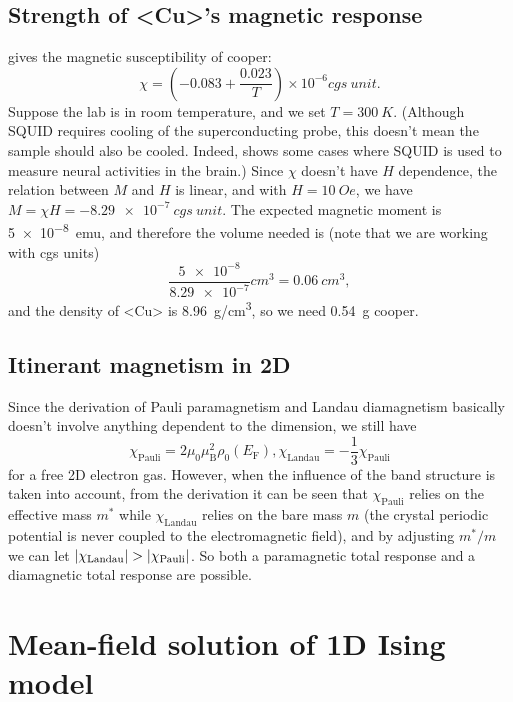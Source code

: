 \documentclass[hyperref, a4paper]{article}
\def\ce#1{<#1>}%
\newcommand*{\efermi}{E_{\text{F}}}
\newcommand*{\muB}{\mu_{\text{B}}}
\begin{document}
\subsection{Strength of \ce{Cu}'s magnetic response}

\cite{cooper_magnetic} gives the magnetic susceptibility of cooper:
\begin{equation}
    \chi=\left(-0.083+\frac{0.023}{T}\right) \times 10^{-6} \unit{cgs\ unit}.
\end{equation}
Suppose the lab is in room temperature, 
and we set $T = \SI{300}{K}$.
(Although SQUID requires cooling of the superconducting probe, 
this doesn't mean the sample should also be cooled. 
Indeed, \cite{singh2014magnetoencephalography} shows 
some cases where SQUID is used to measure 
neural activities in the brain.)
Since $\chi$ doesn't have $H$ dependence,
the relation between $M$ and $H$ is linear,
and with $H = \SI{10}{Oe}$,
we have $M = \chi H = \SI{-8.29e-7}{cgs\ unit}$.
The expected magnetic moment is \SI{5e-8}{emu}, 
and therefore the volume needed is (note that we are working with cgs units)
\[
    \frac{\num{5e-8}}{\num{8.29e-7}} \unit{cm^3} = \SI{0.06}{cm^3},
\]
and the density of \ce{Cu} is \SI{8.96}{g/cm^3},
so we need \SI{0.54}{g} cooper.

\subsection{Itinerant magnetism in 2D}

Since the derivation of Pauli paramagnetism 
and Landau diamagnetism basically 
doesn't involve anything dependent to the dimension,
we still have 
\begin{equation}
    \chi_{\text{Pauli}} = 2 \mu_0 \muB^2 \rho_0(\efermi),
    \chi_{\text{Landau}} = - \frac{1}{3} \chi_{\text{Pauli}}
\end{equation}
for a free 2D electron gas. 
However, when the influence of the band structure is taken into account, 
from the derivation it can be seen that 
$\chi_{\text{Pauli}}$ relies on the effective mass $m^*$
while $\chi_{\text{Landau}}$ relies on the bare mass $m$
(the crystal periodic potential is never coupled to 
the electromagnetic field), 
and by adjusting $m^* / m$ 
we can let $\abs{\chi_{\text{Landau}}} > \abs{\chi_{\text{Pauli}}}$.
So both a paramagnetic total response and a diamagnetic total response are possible.


\section{Mean-field solution of 1D Ising model}
\end{document}

